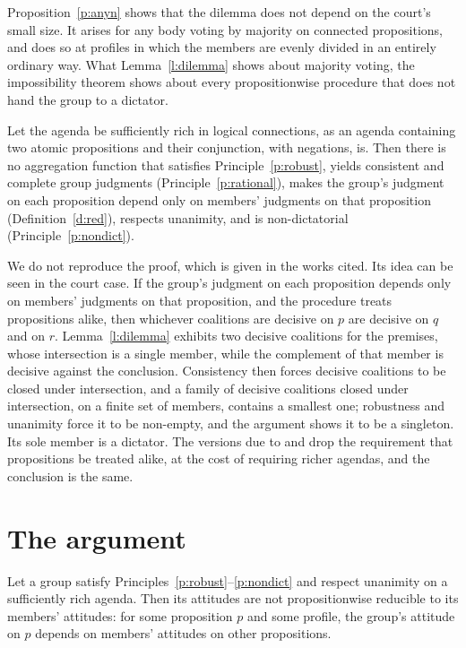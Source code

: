 \documentclass{situationist-preprint}
\begin{document}
Proposition~\ref{p:anyn} shows that the dilemma does not depend on the court's small size. It arises for any body voting by majority on connected propositions, and does so at profiles in which the members are evenly divided in an entirely ordinary way. What Lemma~\ref{l:dilemma} shows about majority voting, the impossibility theorem shows about every propositionwise procedure that does not hand the group to a dictator.

\begin{theorem}\label{t:imposs}
Let the agenda be sufficiently rich in logical connections, as an agenda containing two atomic propositions and their conjunction, with negations, is. Then there is no aggregation function that satisfies Principle~\ref{p:robust}, yields consistent and complete group judgments (Principle~\ref{p:rational}), makes the group's judgment on each proposition depend only on members' judgments on that proposition (Definition~\ref{d:red}), respects unanimity, and is non-dictatorial (Principle~\ref{p:nondict}).
\end{theorem}

We do not reproduce the proof, which is given in the works cited. Its idea can be seen in the court case. If the group's judgment on each proposition depends only on members' judgments on that proposition, and the procedure treats propositions alike, then whichever coalitions are decisive on $p$ are decisive on $q$ and on $r$. Lemma~\ref{l:dilemma} exhibits two decisive coalitions for the premises, whose intersection is a single member, while the complement of that member is decisive against the conclusion. Consistency then forces decisive coalitions to be closed under intersection, and a family of decisive coalitions closed under intersection, on a finite set of members, contains a smallest one; robustness and unanimity force it to be non-empty, and the argument shows it to be a singleton. Its sole member is a dictator. The versions due to \citet{PaulyVanHees2006} and \citet{DietrichList2007} drop the requirement that propositions be treated alike, at the cost of requiring richer agendas, and the conclusion is the same.

\section{The argument}\label{s:argument}

\begin{lemma}\label{l:forced}
Let a group satisfy Principles~\ref{p:robust}--\ref{p:nondict} and respect unanimity on a sufficiently rich agenda. Then its attitudes are not propositionwise reducible to its members' attitudes: for some proposition $p$ and some profile, the group's attitude on $p$ depends on members' attitudes on other propositions.
\end{lemma}
\end{document}
